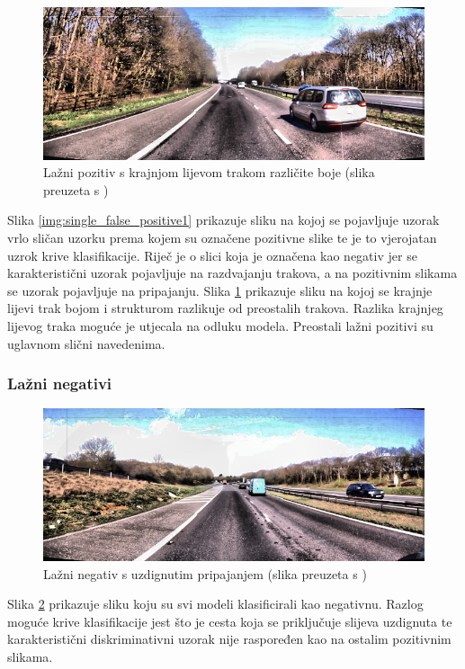 \documentclass[times, utf8, diplomski, numeric]{fer}
\begin{document}
\begin{figure}[H]
\centering
\includegraphics[scale=0.5]{images/single_false_positive2.png}
\caption{Lažni pozitiv s krajnjom lijevom trakom različite boje (slika preuzeta s \citep{url:ftts_irap})}
\label{img:single_false_positive2}
\end{figure}
Slika \ref{img:single_false_positive1} prikazuje sliku na kojoj se pojavljuje uzorak vrlo sličan uzorku prema kojem su označene pozitivne slike te je to vjerojatan uzrok krive klasifikacije.
Riječ je o slici koja je označena kao negativ jer se karakteristični uzorak pojavljuje na razdvajanju trakova, a na pozitivnim slikama se uzorak pojavljuje na pripajanju.
Slika \ref{img:single_false_positive2} prikazuje sliku na kojoj se krajnje lijevi trak bojom i strukturom razlikuje od preostalih trakova. 
Razlika krajnjeg lijevog traka moguće je utjecala na odluku modela.
Preostali lažni pozitivi su uglavnom slični navedenima.

\subsubsection{Lažni negativi }
\begin{figure}[H]
\centering
\includegraphics[scale=0.5]{images/single_false_negative.png}
\caption{Lažni negativ s uzdignutim pripajanjem (slika preuzeta s \citep{url:ftts_irap})}
\label{img:single_false_negative}
\end{figure}
Slika \ref{img:single_false_negative} prikazuje sliku koju su svi modeli klasificirali kao negativnu.
Razlog moguće krive klasifikacije jest što je cesta koja se priključuje slijeva uzdignuta te karakteristični diskriminativni uzorak nije raspoređen kao na ostalim pozitivnim slikama.
\end{document}
